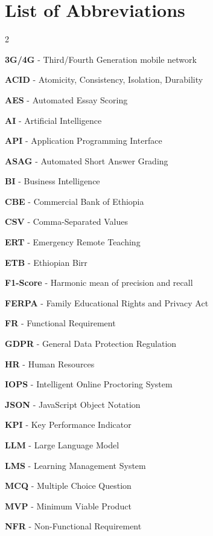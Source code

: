 \section*{List of Abbreviations}
{}
\begin{multicols}{2}
\begin{description}
    \item \textbf{3G/4G} - Third/Fourth Generation mobile network
    \item \textbf{ACID} - Atomicity, Consistency, Isolation, Durability
    \item \textbf{AES} - Automated Essay Scoring
    \item \textbf{AI} - Artificial Intelligence
    \item \textbf{API} - Application Programming Interface
    \item \textbf{ASAG} - Automated Short Answer Grading
    \item \textbf{BI} - Business Intelligence
    \item \textbf{CBE} - Commercial Bank of Ethiopia
    \item \textbf{CSV} - Comma-Separated Values
    \item \textbf{ERT} - Emergency Remote Teaching
    \item \textbf{ETB} - Ethiopian Birr
    \item \textbf{F1-Score} - Harmonic mean of precision and recall
    \item \textbf{FERPA} - Family Educational Rights and Privacy Act
    \item \textbf{FR} - Functional Requirement
    \item \textbf{GDPR} - General Data Protection Regulation
    \item \textbf{HR} - Human Resources
    \item \textbf{IOPS} - Intelligent Online Proctoring System
    \item \textbf{JSON} - JavaScript Object Notation
    \item \textbf{KPI} - Key Performance Indicator
    \item \textbf{LLM} - Large Language Model
    \item \textbf{LMS} - Learning Management System
    \item \textbf{MCQ} - Multiple Choice Question
    \item \textbf{MVP} - Minimum Viable Product
    \item \textbf{NFR} - Non-Functional Requirement

\end{description}
\end{multicols}
